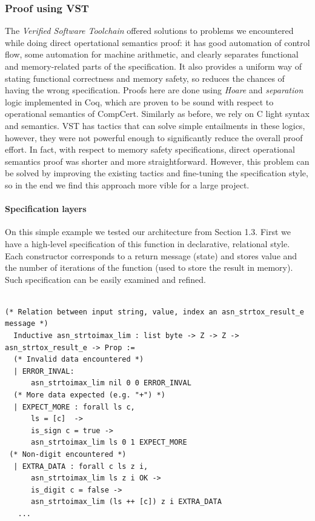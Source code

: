 \documentclass[acmsmall,nonacm]{acmart}
\begin{document}
\subsubsection{Proof using VST}

The \textit{Verified Software Toolchain}\cite{VST} offered
solutions to problems we encountered while doing direct opertational
semantics proof: it has good automation of control flow, some
automation for machine arithmetic, and clearly separates functional
and memory-related parts of the specification. It also provides a
uniform way of stating functional correctness and memory
safety, so reduces the chances of having the wrong specification. Proofs here are done using \textit{Hoare} and \textit{separation}
logic implemented in Coq, which are proven to be sound with respect to operational
semantics of CompCert. Similarly as before, we rely on C light syntax and semantics. VST has tactics that can solve simple entailments in these
logics, however, they were not powerful enough to significantly reduce
the overall proof effort. In fact, with respect to memory safety specifications,
direct operational semantics proof was shorter and more
straightforward. However, this problem can be solved by improving the existing tactics and fine-tuning the specification style, so in the end we find this approach more vible for a large project.

\paragraph{Specification layers} On this simple example we tested our architecture from Section 1.3. First we have a high-level specification of this function in declarative, relational style. Each constructor corresponds to a return message (state) and stores value and the number of iterations of the function (used to store the result in memory). Such specification can be easily examined and refined.

 \begin{lstlisting}[language=Coq]

(* Relation between input string, value, index an asn_strtox_result_e message *)
  Inductive asn_strtoimax_lim : list byte -> Z -> Z -> asn_strtox_result_e -> Prop :=
  (* Invalid data encountered *)
  | ERROR_INVAL:
      asn_strtoimax_lim nil 0 0 ERROR_INVAL
  (* More data expected (e.g. "+") *)
  | EXPECT_MORE : forall ls c,
      ls = [c]  ->
      is_sign c = true ->
      asn_strtoimax_lim ls 0 1 EXPECT_MORE
 (* Non-digit encountered *)
  | EXTRA_DATA : forall c ls z i,
      asn_strtoimax_lim ls z i OK ->
      is_digit c = false -> 
      asn_strtoimax_lim (ls ++ [c]) z i EXTRA_DATA
   ...    
  \end{lstlisting}
\end{document}

